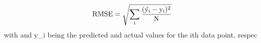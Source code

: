 $$\rm{RMSE}=\sqrt{\sum\limits_{i}\frac{(\hat{y_i}-y_i)^2}{N}}$$
with  and y_i being the predicted and actual values for the ith data point, respec